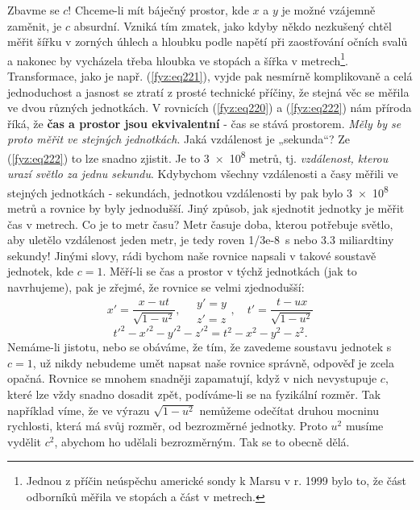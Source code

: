     Zbavme se \(c\)! Chceme-li mít báječný prostor, kde \(x\) a \(y\) je možné vzájemně zaměnit, je
    \(c\) absurdní. Vzniká tím zmatek, jako kdyby někdo nezkušený chtěl měřit šířku v zorných úhlech
    a hloubku podle napětí při zaostřování očních svalů a nakonec by vycházela třeba hloubka ve
    stopách a šířka v metrech\footnote{Jednou z příčin neúspěchu americké sondy k Marsu v r.
    \num{1999} bylo to, že část odborníků měřila ve stopách a část v metrech.}. Transformace, jako
    je např. (\ref{fyz:eq221}), vyjde pak nesmírně komplikovaně a celá jednoduchost a jasnost se
    ztratí z prosté technické příčiny, že stejná věc se měřila ve dvou různých jednotkách. V
    rovnicích (\ref{fyz:eq220}) a (\ref{fyz:eq222}) nám příroda říká, že \textbf{čas a prostor jsou
    ekvivalentní} - čas se stává prostorem. \emph{Měly by se proto měřit ve stejných jednotkách}.
    Jaká vzdálenost je „sekunda“? Ze (\ref{fyz:eq222}) to lze snadno zjistit. Je to \num{3e8} metrů,
    tj. \emph{vzdálenost, kterou urazí světlo za jednu sekundu}. Kdybychom všechny vzdálenosti a
    časy měřili ve stejných jednotkách - sekundách, jednotkou vzdálenosti by pak bylo \num{3e8}
    metrů a rovnice by byly jednodušší. Jiný způsob, jak sjednotit jednotky je měřit čas v metrech.
    Co je to metr času? Metr časuje doba, kterou potřebuje světlo, aby uletělo vzdálenost jeden
    metr, je tedy roven \SI{1/3e-8}{\s} nebo \num{3.3} miliardtiny sekundy! Jinými slovy, rádi
    bychom naše rovnice napsali v takové soustavě jednotek, kde \(c = 1\). Měří-li se čas a prostor
    v týchž jednotkách (jak to navrhujeme), pak je zřejmé, že rovnice se velmi zjednodušší:
    \begin{equation}\label{fyz:eq223}
      x' = \frac{x - ut}{\sqrt{1-u^2}},              \quad
      \begin{array}{c}
        y' = y \\ 
        z' = z
      \end{array}\!,                                 \quad
        t' = \frac{t-ux}{\sqrt{1-u^2}} 
    \end{equation}
    \begin{equation}\label{fyz:eq224}
      t'^2 - x'^2 - y'^2 - z'^2 = t^2 - x^2 - y^2 - z^2.
    \end{equation}
    Nemáme-li jistotu, nebo se obáváme, že tím, že zavedeme soustavu jednotek s \(c= 1\), už nikdy 
    nebudeme umět napsat naše rovnice správně, odpověď je zcela opačná. Rovnice se mnohem snadněji 
    zapamatují, když v nich nevystupuje \(c\), které lze vždy snadno dosadit zpět, podíváme-li se 
    na fyzikální rozměr. Tak například víme, že ve výrazu \(\sqrt{1 - u^2}\) nemůžeme odečítat 
    druhou mocninu rychlosti, která má svůj rozměr, od bezrozměrné jednotky. Proto \(u^2\) musíme 
    vydělit \(c^2\), abychom ho udělali bezrozměrným. Tak se to obecně dělá.
    
